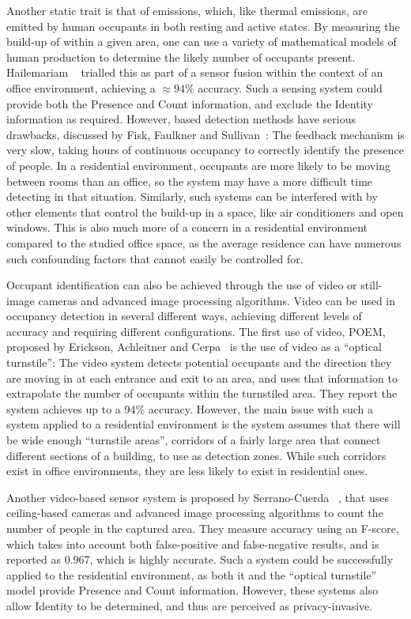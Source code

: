 \documentclass[../thesis/thesis.tex]{subfiles}
\begin{document}
Another static trait is that of \cdi emissions, which, like thermal emissions, are emitted by human occupants in both resting and active states. By measuring the build-up of \cdi within a given area, one can use a variety of mathematical models of human \cdi production to determine the likely number of occupants present. Hailemariam \etal~\cite{hailemariam2011real} trialled this as part of a sensor fusion within the context of an office environment, achieving a $\approx94\%$ accuracy. Such a sensing system could provide both the Presence and Count information, and exclude the Identity information as required. However, \cdi based detection methods have serious drawbacks, discussed by Fisk, Faulkner and Sullivan~\cite{fisk2006accuracy}: The \cdi feedback mechanism is very slow, taking hours of continuous occupancy to correctly identify the presence of people. In a residential environment, occupants are more likely to be moving between rooms than an office, so the system may have a more difficult time detecting in that situation. Similarly, such systems can be interfered with by other elements that control the \cdi build-up in a space, like air conditioners and open windows. This is also much more of a concern in a residential environment compared to the studied office space, as the average residence can have numerous such confounding factors that cannot easily be controlled for.

Occupant identification can also be achieved through the use of video or still-image cameras and advanced image processing algorithms. Video can be used in occupancy detection in several different ways, achieving different levels of accuracy and requiring different configurations. The first use of video, POEM, proposed by Erickson, Achleitner and Cerpa~\cite{erickson2013poem} is the use of video as a ``optical turnstile'': The video system detects potential occupants and the direction they are moving in at each entrance and exit to an area, and uses that information to extrapolate the number of occupants within the turnstiled area. They report the system achieves up to a 94\% accuracy. However, the main issue with such a system applied to a residential environment is the system assumes that there will be wide enough ``turnstile areas'', corridors of a fairly large area that connect different sections of a building, to use as detection zones. While such corridors exist in office environments, they are less likely to exist in residential ones.

Another video-based sensor system is proposed by Serrano-Cuerda \etal~\cite{serrano2013efficient}, that uses ceiling-based cameras and advanced image processing algorithms to count the number of people in the captured area. They measure accuracy using an F-score, which takes into account both false-positive and false-negative results, and is reported as 0.967, which is highly accurate. Such a system could be successfully applied to the residential environment, as both it and the ``optical turnstile'' model provide Presence and Count information. However, these systems also allow Identity to be determined, and thus are perceived as privacy-invasive.
\end{document}

